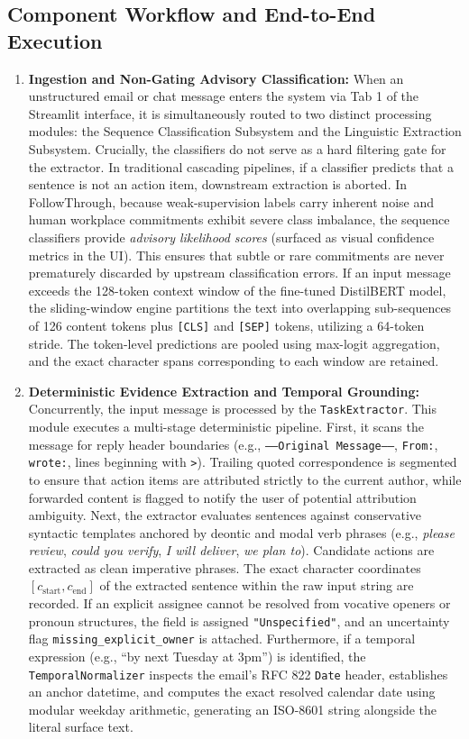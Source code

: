 \documentclass[conference]{IEEEtran}
\begin{document}
\subsection{Component Workflow and End-to-End Execution}
\begin{enumerate}
    \item \textbf{Ingestion and Non-Gating Advisory Classification:} When an unstructured email or chat message enters the system via Tab 1 of the Streamlit interface, it is simultaneously routed to two distinct processing modules: the Sequence Classification Subsystem and the Linguistic Extraction Subsystem. Crucially, the classifiers do not serve as a hard filtering gate for the extractor. In traditional cascading pipelines, if a classifier predicts that a sentence is not an action item, downstream extraction is aborted. In FollowThrough, because weak-supervision labels carry inherent noise and human workplace commitments exhibit severe class imbalance, the sequence classifiers provide \textit{advisory likelihood scores} (surfaced as visual confidence metrics in the UI). This ensures that subtle or rare commitments are never prematurely discarded by upstream classification errors. If an input message exceeds the 128-token context window of the fine-tuned DistilBERT model, the sliding-window engine partitions the text into overlapping sub-sequences of 126 content tokens plus \texttt{[CLS]} and \texttt{[SEP]} tokens, utilizing a 64-token stride. The token-level predictions are pooled using max-logit aggregation, and the exact character spans corresponding to each window are retained.
    \item \textbf{Deterministic Evidence Extraction and Temporal Grounding:} Concurrently, the input message is processed by the \texttt{TaskExtractor}. This module executes a multi-stage deterministic pipeline. First, it scans the message for reply header boundaries (e.g., \texttt{-----Original Message-----}, \texttt{From:}, \texttt{wrote:}, lines beginning with \texttt{>}). Trailing quoted correspondence is segmented to ensure that action items are attributed strictly to the current author, while forwarded content is flagged to notify the user of potential attribution ambiguity. Next, the extractor evaluates sentences against conservative syntactic templates anchored by deontic and modal verb phrases (e.g., \textit{please review}, \textit{could you verify}, \textit{I will deliver}, \textit{we plan to}). Candidate actions are extracted as clean imperative phrases. The exact character coordinates $[c_{\text{start}}, c_{\text{end}}]$ of the extracted sentence within the raw input string are recorded. If an explicit assignee cannot be resolved from vocative openers or pronoun structures, the field is assigned \texttt{"Unspecified"}, and an uncertainty flag \texttt{missing\_explicit\_owner} is attached. Furthermore, if a temporal expression (e.g., ``by next Tuesday at 3pm'') is identified, the \texttt{TemporalNormalizer} inspects the email's RFC 822 \texttt{Date} header, establishes an anchor datetime, and computes the exact resolved calendar date using modular weekday arithmetic, generating an ISO-8601 string alongside the literal surface text.

\end{enumerate}
\end{document}
